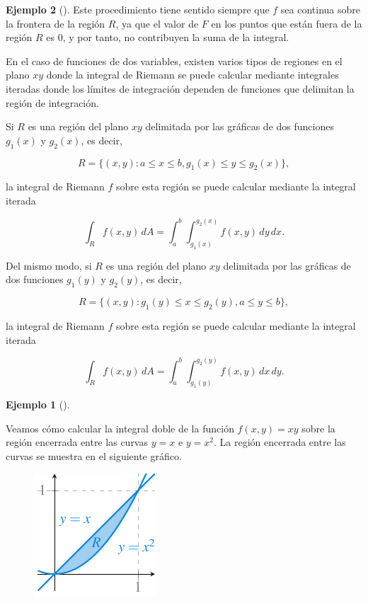 \documentclass[
  a4paper,
]{scrreport}
\theoremstyle{definition}
\newtheorem{example}{Ejemplo}[chapter]
\theoremstyle{plain}
\theoremstyle{definition}
\theoremstyle{definition}
\theoremstyle{plain}
\theoremstyle{plain}
\theoremstyle{remark}
\begin{document}
\begin{example}[]
Este procedimiento tiene sentido siempre que \(f\) sea continua sobre la
frontera de la región \(R\), ya que el valor de \(F\) en los puntos que
están fuera de la región \(R\) es \(0\), y por tanto, no contribuyen la
suma de la integral.

En el caso de funciones de dos variables, existen varios tipos de
regiones en el plano \(xy\) donde la integral de Riemann se puede
calcular mediante integrales iteradas donde los límites de integración
dependen de funciones que delimitan la región de integración.

Si \(R\) es una región del plano \(xy\) delimitada por las gráficas de
dos funciones \(g_1(x)\) y \(g_2(x)\), es decir,

\[
R = \{(x,y): a\leq x \leq b, g_1(x)\leq y \leq g_2(x)\},
\]

la integral de Riemann \(f\) sobre esta región se puede calcular
mediante la integral iterada

\[
\int_{R} f(x,y)\,dA
= \int_a^b \int_{g_1(x)}^{g_2(x)} f(x,y)\,dy\,dx.
\]

Del mismo modo, si \(R\) es una región del plano \(xy\) delimitada por
las gráficas de dos funciones \(g_1(y)\) y \(g_2(y)\), es decir,

\[
R = \{(x,y): g_1(y)\leq x \leq g_2(y), a\leq y\leq b\},
\]

la integral de Riemann \(f\) sobre esta región se puede calcular
mediante la integral iterada

\[
\int_{R} f(x,y)\,dA 
= \int_a^b \int_{g_1(y)}^{g_2(y)} f(x,y)\,dx\,dy.
\]

\begin{example}[]\protect\hypertarget{exm-integral-region-irregular}{}\label{exm-integral-region-irregular}

Veamos cómo calcular la integral doble de la función \(f(x,y)=xy\) sobre
la región encerrada entre las curvas \(y=x\) e \(y=x^2\). La región
encerrada entre las curvas se muestra en el siguiente gráfico.

\begin{figure}[H]

{\centering \includegraphics{img/integrales-funciones-varias-variables/region-irregular.pdf}

}
\end{figure}
\end{example}
\end{example}
\end{document}
